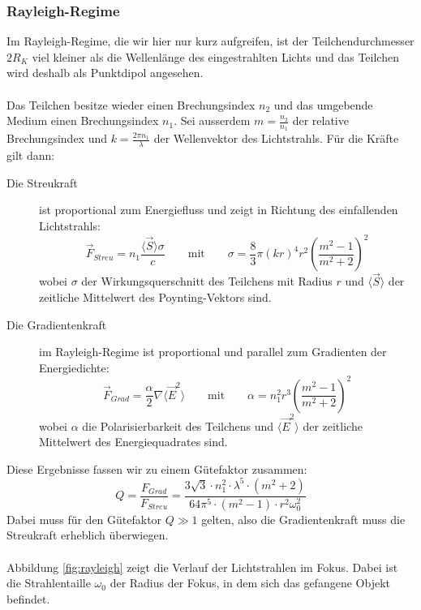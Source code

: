 \documentclass[a4paper,titlepage]{scrartcl}
\numberwithin{equation}{section}
\begin{document}
\subsubsection{Rayleigh-Regime}
Im Rayleigh-Regime, die wir hier nur kurz aufgreifen, ist der Teilchendurchmesser $2R_K$ viel kleiner als die Wellenlänge des eingestrahlten Lichts und das Teilchen wird deshalb als Punktdipol angesehen.\\ \\
Das Teilchen besitze wieder einen Brechungsindex $n_2$ und das umgebende Medium einen Brechungsindex $n_1$. Sei ausserdem $m=\frac{n_2}{n_1}$ der relative Brechungsindex und $k=\frac{2 \pi n_1}{\lambda}$ der Wellenvektor des Lichtstrahls. Für die Kräfte gilt dann:
\begin{description}
\item[Die Streukraft] ist proportional zum Energiefluss und zeigt in Richtung des einfallenden Lichtstrahls:
\begin{equation*}
\vec{F}_{Streu}=n_1 \frac{\langle \vec{S} \rangle \sigma}{c} \quad \quad \text{mit} \quad \quad \sigma=\frac{8}{3} \pi (kr)^4r^2 \left( \frac{m^2-1}{m^2+2} \right)^2
\end{equation*}
wobei $\sigma$ der Wirkungsquerschnitt des Teilchens mit Radius $r$ und $\langle \vec{S} \rangle$ der zeitliche Mittelwert des Poynting-Vektors sind.
\item[Die Gradientenkraft] im Rayleigh-Regime ist proportional und parallel zum Gradienten der Energiedichte:
\begin{equation*}
\vec{F}_{Grad}=\frac{\alpha}{2} \nabla \langle \vec{E}^2 \rangle \quad \quad \text{mit} \quad \quad \alpha=n_1^2r^3 \left( \frac{m^2-1}{m^2+2} \right)^2
\end{equation*}
wobei $\alpha$ die Polarisierbarkeit des Teilchens und $\langle \vec{E}^2 \rangle$ der zeitliche Mittelwert des Energiequadrates sind.
\end{description}
Diese Ergebnisse fassen wir zu einem Gütefaktor zusammen:
\begin{equation*}
Q=\frac{F_{Grad}}{F_{Streu}}=\frac{3 \sqrt{3} \cdot n_1^2 \cdot \lambda^5 \cdot (m^2 + 2)}{64 \pi^5 \cdot (m^2-1) \cdot r^2 \omega_0^2}
\end{equation*}
Dabei muss für den Gütefaktor $Q \gg 1$ gelten, also die Gradientenkraft muss die Streukraft erheblich überwiegen.\\ \\
Abbildung \ref{fig:rayleigh} zeigt die Verlauf der Lichtstrahlen im Fokus. Dabei ist die Strahlentaille $\omega_0$ der Radius der Fokus, in dem sich das gefangene Objekt befindet.
\end{document}
